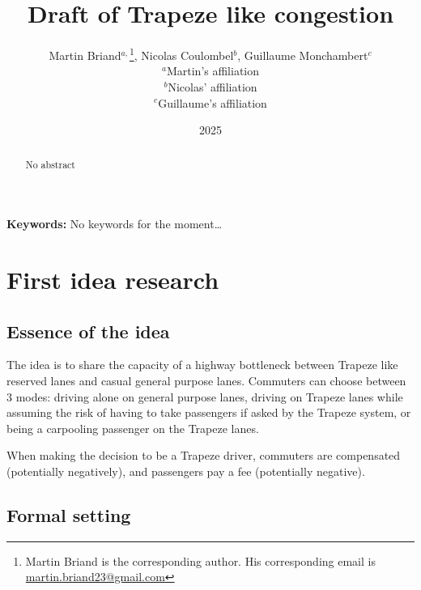 \documentclass[english, a4paper]{article}
\title{Draft of Trapeze like congestion}
\author{Martin Briand$^{a,}$\footnote{Martin Briand is the corresponding author. His corresponding email is \href{mailto:martin.briand23@gmail.com}{martin.briand23@gmail.com}}, Nicolas Coulombel$^{b}$, Guillaume Monchambert$^{c}$\\
\small $^{a}$Martin’s affiliation\\
\small $^{b}$Nicolas’ affiliation\\
\small $^{c}$Guillaume’s affiliation}
\date{2025}
\theoremstyle{plain}
\newcommand{\keywords}[1]
{
    \small
    \textbf{Keywords:} #1
    \vspace{0.2cm}
}
\begin{document}
\maketitle

\begin{abstract}
    No abstract
\end{abstract}

\keywords{No keywords for the moment…}

\section{First idea research}

\subsection{Essence of the idea}

The idea is to share the capacity of a highway bottleneck between Trapeze like reserved lanes and casual general purpose lanes. Commuters can choose between 3 modes: driving alone on general purpose lanes, driving on Trapeze lanes while assuming the risk of having to take passengers if asked by the Trapeze system, or being a carpooling passenger on the Trapeze lanes.

When making the decision to be a Trapeze driver, commuters are compensated (potentially negatively), and passengers pay a fee (potentially negative).

\subsection{Formal setting}
\end{document}
